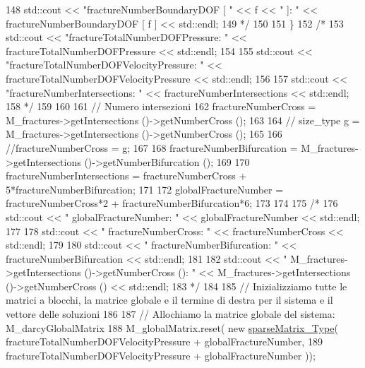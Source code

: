 \begin{DoxyCode}
148 \textcolor{comment}{        std::cout << "fractureNumberBoundaryDOF [ " << f << " ]:  " << fractureNumberBoundaryDOF [ f ] <<
       std::endl;}
149 \textcolor{comment}{      */}    
150         
151     \}
152     \textcolor{comment}{/*}
153 \textcolor{comment}{    std::cout << "fractureTotalNumberDOFPressure:  " << fractureTotalNumberDOFPressure << std::endl;}
154 \textcolor{comment}{      }
155 \textcolor{comment}{    std::cout << "fractureTotalNumberDOFVelocityPressure:  " << fractureTotalNumberDOFVelocityPressure <<
       std::endl;}
156 \textcolor{comment}{}
157 \textcolor{comment}{    std::cout << "fractureNumberIntersections:  " << fractureNumberIntersections << std::endl;}
158 \textcolor{comment}{    */}
159     
160 
161     \textcolor{comment}{// Numero intersezioni}
162     fractureNumberCross = M\_fractures->getIntersections ()->getNumberCross ();
163        
164    \textcolor{comment}{// size\_type g = M\_fractures->getIntersections ()->getNumberCross ();}
165 
166     \textcolor{comment}{//fractureNumberCross = g;}
167     
168     fractureNumberBifurcation = M\_fractures->getIntersections ()->getNumberBifurcation ();
169     
170     fractureNumberIntersections = fractureNumberCross + 5*fractureNumberBifurcation;
171     
172     globalFractureNumber = fractureNumberCross*2 + fractureNumberBifurcation*6;
173     
174 
175     \textcolor{comment}{/*}
176 \textcolor{comment}{    std::cout << " globalFractureNumber: " << globalFractureNumber << std::endl;}
177 \textcolor{comment}{    }
178 \textcolor{comment}{    std::cout << " fractureNumberCross: " << fractureNumberCross << std::endl;}
179 \textcolor{comment}{    }
180 \textcolor{comment}{    std::cout << " fractureNumberBifurcation: " << fractureNumberBifurcation << std::endl;}
181 \textcolor{comment}{   }
182 \textcolor{comment}{    std::cout << " M\_fractures->getIntersections ()->getNumberCross (): " << M\_fractures->getIntersections
       ()->getNumberCross () << std::endl; }
183 \textcolor{comment}{    */}
184     
185     \textcolor{comment}{// Inizializziamo tutte le matrici a blocchi, la matrice globale e il termine di destra per il sistema
       e il vettore delle soluzioni }
186     
187     \textcolor{comment}{// Allochiamo la matrice globale del sistema:  M\_darcyGlobalMatrix}
188     M\_globalMatrix.reset( \textcolor{keyword}{new} \hyperlink{Core_8h_afba9f623673e2ae32054015bdb5500f9}{sparseMatrix\_Type}( fractureTotalNumberDOFVelocityPressure + 
      globalFractureNumber,
189                                                  fractureTotalNumberDOFVelocityPressure + 
      globalFractureNumber ));

\end{DoxyCode}
